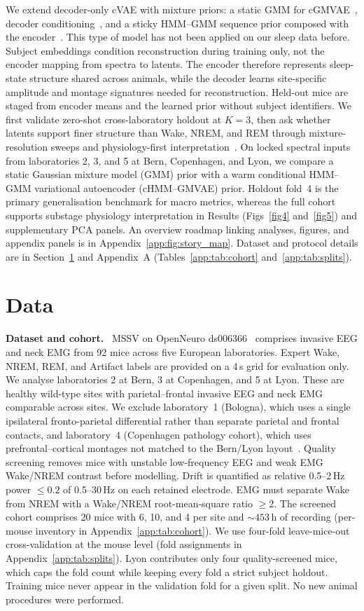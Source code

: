 \documentclass[10pt,letterpaper]{article}
\newcommand{\methodpara}[1]{\par\vspace{0.85em}\noindent\textbf{#1}\ }
\newcommand{\apdx}[1]{Appendix~\ref{#1}}
\newcommand{\papersection}[1]{\section{#1}}
\newcommand{\papersection}[1]{\section*{#1}}
\begin{document}
We extend decoder-only cVAE with mixture priors: a static GMM for cGMVAE~\cite{dilokthanakul2016gmvae}, decoder conditioning~\cite{sohn2015cvae}, and a sticky HMM--GMM sequence prior composed with the encoder~\cite{johnson2016svae}.
This type of model has not been applied on our sleep data before. Subject embeddings condition reconstruction during training only, not the encoder mapping from spectra to latents.
The encoder therefore represents sleep-state structure shared across animals, while the decoder learns site-specific amplitude and montage signatures needed for reconstruction.
Held-out mice are staged from encoder means and the learned prior without subject identifiers.
We first validate zero-shot cross-laboratory holdout at $K{=}3$, then ask whether latents support finer structure than Wake, NREM, and REM through mixture-resolution sweeps and physiology-first interpretation~\cite{katsageorgiou2018mcRBM,elmgreen2026thesis}.
On locked spectral inputs from laboratories 2, 3, and 5 at Bern, Copenhagen, and Lyon, we compare a static Gaussian mixture model (GMM) prior with a warm conditional HMM--GMM variational autoencoder (cHMM--GMVAE) prior.
Holdout fold~4 is the primary generalisation benchmark for macro metrics, whereas the full cohort supports substage physiology interpretation in Results (Figs~\ref{fig4} and~\ref{fig5}) and supplementary PCA panels.
An overview roadmap linking analyses, figures, and appendix panels is in \apdx{app:fig:story_map}.
Dataset and protocol details are in Section~\ref{sec:data} and Appendix~A (Tables~\ref{app:tab:cohort} and~\ref{app:tab:splits}).

\papersection{Data}
\label{sec:data}

\methodpara{Dataset and cohort.}
MSSV on OpenNeuro ds006366~\cite{rose2025mssv} comprises invasive EEG and neck EMG from 92 mice across five European laboratories.
Expert Wake, NREM, REM, and Artifact labels are provided on a 4\,s grid for evaluation only.
We analyse laboratories 2 at Bern, 3 at Copenhagen, and 5 at Lyon.
These are healthy wild-type sites with parietal--frontal invasive EEG and neck EMG comparable across sites.
We exclude laboratory~1 (Bologna), which uses a single ipsilateral fronto-parietal differential rather than separate parietal and frontal contacts, and laboratory~4 (Copenhagen pathology cohort), which uses prefrontal--cortical montages not matched to the Bern/Lyon layout~\cite{rose2025mssv}.
Quality screening removes mice with unstable low-frequency EEG and weak EMG Wake/NREM contrast before modelling.
Drift is quantified as relative 0.5--2\,Hz power $\leq 0.2$ of 0.5--30\,Hz on each retained electrode.
EMG must separate Wake from NREM with a Wake/NREM root-mean-square ratio $\geq 2$.
The screened cohort comprises 20 mice with 6, 10, and 4 per site and ${\sim}453$\,h of recording (per-mouse inventory in \apdx{app:tab:cohort}).
We use four-fold leave-mice-out cross-validation at the mouse level (fold assignments in \apdx{app:tab:splits}).
Lyon contributes only four quality-screened mice, which caps the fold count while keeping every fold a strict subject holdout.
Training mice never appear in the validation fold for a given split.
No new animal procedures were performed.
\end{document}

